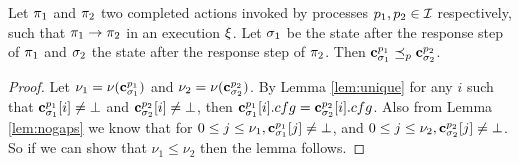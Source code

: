 \begin{lemma}
	\label{lem:prefix}
Let $\pi_1$ and $\pi_2$ two 
completed  actions invoked by processes $p_1, p_2\in\mathcal{I}$ 
respectively, such that $\pi_1\rightarrow\pi_2$ in an execution $\EX$. Let $\sigma_1$ be the state after the response 
step of $\pi_1$ and $\sigma_2$ the state after the response step 
of $\pi_2$. Then 
$\mathbf{c}^{p_1}_{\sigma_1}\preceq_p\mathbf{c}^{p_2}_{\sigma_2}$.
\end{lemma}

\begin{proof}
	Let $\nu_1 = \nu(\mathbf{c}^{p_1}_{\sigma_1})$ and $\nu_2 = \nu(\mathbf{c}^{p_2}_{\sigma_2})$.
	By Lemma \ref{lem:unique} for any $i$ such that $\mathbf{c}^{p_1}_{\sigma_1}[i]\neq\bot$ and 
	$\mathbf{c}^{p_2}_{\sigma_2}[i]\neq\bot$, then $\mathbf{c}^{p_1}_{\sigma_1}[i].cfg=\mathbf{c}^{p_2}_{\sigma_2}[i].cfg$.
	Also from Lemma \ref{lem:nogaps} we know that for $0\leq j\leq \nu_1, \mathbf{c}^{p_1}_{\sigma_1}[j] \neq \bot$, 
	and $0\leq j\leq \nu_2, \mathbf{c}^{p_2}_{\sigma_2}[j] \neq \bot$. So if we can show that $\nu_1\leq \nu_2$ then the lemma follows. 
	

\end{proof}
